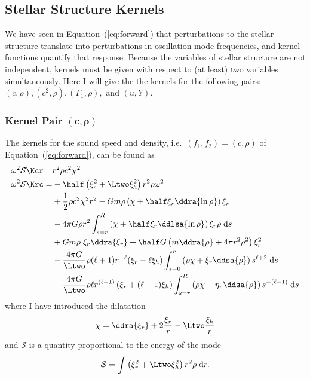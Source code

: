 \subsection{Stellar Structure Kernels}
\label{sec:kernels}
We have seen in Equation~(\ref{eq:forward}) that perturbations to the stellar structure translate into perturbations in oscillation mode frequencies, and kernel functions quantify that response. 
Because the variables of stellar structure are not independent, kernels must be given with respect to (at least) two variables simultaneously. 
Here I will give the the kernels for the following pairs: ${(c,\rho)}, {(c^2,\rho)}, {(\Gamma_1,\rho)},$ and ${(u,Y)}$. 

\subsubsection*{Kernel Pair \texorpdfstring{$\mathbf{(c, \rho)}$}{(c,rho)}}
\noindent
The kernels for the sound speed and density, i.e.\ ${(f_1, f_2) = (c, \rho)}$ of Equation~(\ref{eq:forward}), can be found as \citep[\emph{cf.}][]{GoughThompson1991}
\begin{align}
    \omega^2 \mathcal{S} \Kcr =& r^2 \rho c^2 \chi^2 
\\  \omega^2 \mathcal{S} \Krc =& -\half \left( \xi_r^2 + \Ltwo \xi_h^2 \right) r^2 \rho \omega^2 
\\& + \frac{1}{2} \rho c^2 \chi^2 r^2 - G m \rho \left( \chi + \half \xi_r \ddra{\ln \rho} \right) \xi_r
\notag\\& - 4\pi G \rho r^2 \int_{s=r}^R \left( \chi + \half \xi_r \ddlsa{\ln \rho} \right) \xi_r \rho \; \text{d}s
\notag\\& + G m \rho \; \xi_r \ddra{\xi_r} + \half G \left(m \ddra{\rho} + 4\pi r^2 \rho^2 \right) \xi_r^2
\notag\\& - \frac{4 \pi G}{\Ltwo} \rho (\ell+1) r^{-\ell} (\xi_r - \ell \xi_h) \int_{s=0}^r \left(\rho \chi + \xi_r \ddsa{\rho} \right) s^{\ell+2} \; \text{d}s 
\notag\\&- \frac{4 \pi G}{\Ltwo} \rho \ell r^{(\ell+1)} \left( \xi_r + (\ell+1) \xi_h \right) \int_{s=r}^R \left( \rho \chi + \eta_r \ddsa{\rho} \right) s^{-(\ell-1)} \; \text{d}s\notag
\end{align}
where %
I have introduced the dilatation
\begin{equation}
    \chi = \ddra{\xi_r} + 2\frac{\xi_r}{r} - \Ltwo \frac{\xi_h}{r}
\end{equation}
and $\mathcal{S}$ is a quantity proportional to the energy of the mode
\begin{equation}
    \mathcal{S} = \int \left( \xi_r^2 + \Ltwo \xi_h^2 \right) r^2 \rho \; \text{d}r. 
\end{equation}


